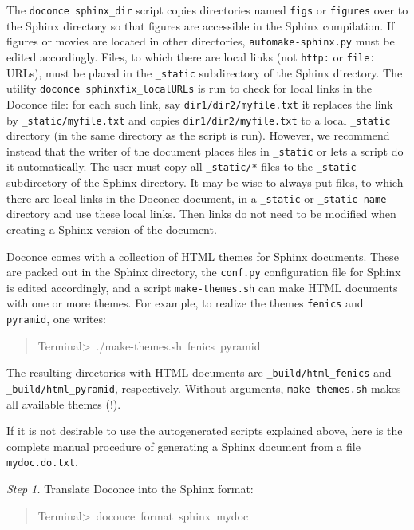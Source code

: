 \documentclass[a4paper]{article}
\begin{document}
The \texttt{doconce sphinx\_dir} script copies directories named \texttt{figs} or
\texttt{figures} over to the Sphinx directory so that figures are accessible
in the Sphinx compilation.  If figures or movies are located in other
directories, \texttt{automake-sphinx.py} must be edited accordingly.  Files,
to which there are local links (not \texttt{http:} or \texttt{file:} URLs), must be
placed in the \texttt{\_static} subdirectory of the Sphinx directory. The
utility \texttt{doconce sphinxfix\_localURLs} is run to check for local links
in the Doconce file: for each such link, say \texttt{dir1/dir2/myfile.txt} it
replaces the link by \texttt{\_static/myfile.txt} and copies
\texttt{dir1/dir2/myfile.txt} to a local \texttt{\_static} directory (in the same
directory as the script is run).  However, we recommend instead that
the writer of the document places files in \texttt{\_static} or lets a script
do it automatically. The user must copy all \texttt{\_static/*} files to the
\texttt{\_static} subdirectory of the Sphinx directory.  It may be wise to
always put files, to which there are local links in the Doconce
document, in a \texttt{\_static} or \texttt{\_static-name} directory and use these
local links. Then links do not need to be modified when creating a
Sphinx version of the document.

Doconce comes with a collection of HTML themes for Sphinx documents.
These are packed out in the Sphinx directory, the \texttt{conf.py}
configuration file for Sphinx is edited accordingly, and a script
\texttt{make-themes.sh} can make HTML documents with one or more themes.
For example,
to realize the themes \texttt{fenics} and \texttt{pyramid}, one writes:
%
\begin{quote}{\ttfamily \raggedright \noindent
Terminal>~./make-themes.sh~fenics~pyramid
}
\end{quote}

The resulting directories with HTML documents are \texttt{\_build/html\_fenics}
and \texttt{\_build/html\_pyramid}, respectively. Without arguments,
\texttt{make-themes.sh} makes all available themes (!).

If it is not desirable to use the autogenerated scripts explained
above, here is the complete manual procedure of generating a
Sphinx document from a file \texttt{mydoc.do.txt}.

\emph{Step 1.} Translate Doconce into the Sphinx format:
%
\begin{quote}{\ttfamily \raggedright \noindent
Terminal>~doconce~format~sphinx~mydoc
}
\end{quote}
\end{document}
